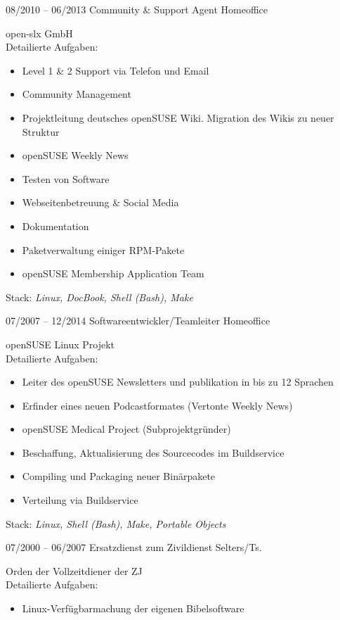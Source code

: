 \documentclass[a4paper]{friggeri-cv} %
\begin{document}
\begin{entrylist}
\entry
{08/2010 -- 06/2013}
{Community \& Support Agent}
{Homeoffice}
{open-slx GmbH \\
    Detailierte Aufgaben:
    \begin{itemize}
        \item Level 1 \& 2 Support via Telefon und Email
        \item Community Management
        \item Projektleitung deutsches openSUSE Wiki. Migration des Wikis zu neuer Struktur
        \item openSUSE Weekly News
        \item Testen von Software
        \item Webseitenbetreuung \& Social Media
        \item Dokumentation
        \item Paketverwaltung einiger RPM-Pakete
        \item openSUSE Membership Application Team
    \end{itemize}
		Stack: \textit{Linux, DocBook, Shell (Bash), Make}
}
\entry
{07/2007 -- 12/2014}
{Softwareentwickler/Teamleiter}
{Homeoffice}
{openSUSE Linux Projekt\\
    Detailierte Aufgaben:
    \begin{itemize}
        \item Leiter des openSUSE Newsletters und publikation in bis zu 12 Sprachen
        \item Erfinder eines neuen Podcastformates (Vertonte Weekly News)
        \item openSUSE Medical Project (Subprojektgründer)
        \item Beschaffung, Aktualisierung des Sourcecodes im Buildservice
        \item Compiling und Packaging neuer Binärpakete
        \item Verteilung via Buildservice
    \end{itemize}
		Stack: \textit{Linux, Shell (Bash), Make, Portable Objects}
}
\entry
{07/2000 -- 06/2007}
{Ersatzdienst zum Zivildienst}
{Selters/Ts.}
{Orden der Vollzeitdiener der ZJ\\
		 Detailierte Aufgaben:
    \begin{itemize}
        \item Linux-Verfügbarmachung der eigenen Bibelsoftware

\end{itemize}}
\end{entrylist}
\end{document}
